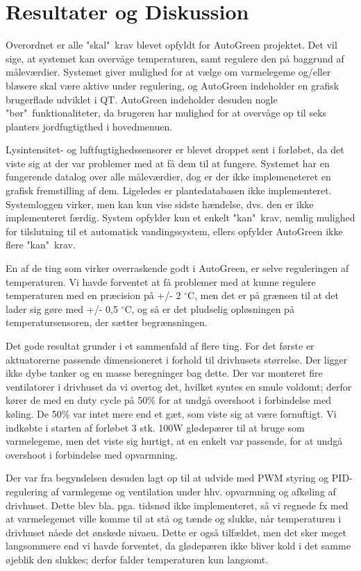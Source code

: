\section{Resultater og Diskussion} \label{ch:Resultater_og_diskussion}

Overordnet er alle "skal"\ krav blevet opfyldt for AutoGreen projektet. 
Det vil sige, at systemet kan overvåge temperaturen, samt regulere den på baggrund af måleværdier. 
Systemet giver mulighed for at vælge om varmelegeme og/eller blæsere skal være aktive under regulering, og AutoGreen indeholder en grafisk brugerflade udviklet i QT. 
AutoGreen indeholder desuden nogle "bør"\ funktionaliteter, da brugeren har mulighed for at overvåge op til seks planters jordfugtigthed i hovedmenuen. 

Lysintensitet- og luftfugtighedssensorer er blevet droppet sent i forløbet, da det viste sig at der var problemer med at få dem til at fungere. 
Systemet har en fungerende datalog over alle måleværdier, dog er der ikke implemeneteret en grafisk fremstilling af dem. 
Ligeledes er plantedatabasen ikke implementeret.
Systemloggen virker, men kan kun vise sidste hændelse, dvs. den er ikke implementeret færdig.
System opfylder kun et enkelt "kan"\ krav, nemlig mulighed for tilslutning til et automatisk vandingssystem, ellers opfylder AutoGreen ikke flere "kan"\ krav. 

\mbox{}

En af de ting som virker overraskende godt i AutoGreen, er selve reguleringen af temperaturen. 
Vi havde forventet at få problemer med at kunne regulere temperaturen med en præcision på +/- 2 $^{\circ}$C, men det er på grænsen til at det lader sig gøre med +/- 0,5 $^{\circ}$C, og så er det pludselig opløsningen på temperatursensoren, der sætter begrænsningen. 

Det gode resultat grunder i et sammenfald af flere ting. 
For det første er aktuatorerne passende dimensioneret i forhold til drivhusets størrelse. 
Der ligger ikke dybe tanker og en masse beregninger bag dette. 
Der var monteret fire ventilatorer i drivhuset da vi overtog det, hvilket syntes en smule voldomt; derfor kører de med en duty cycle på 50\% for at undgå overshoot i forbindelse med køling.
De 50\% var intet mere end et gæt, som viste sig at være fornuftigt.
Vi indkøbte i starten af forløbet 3 stk. 100W glødepærer til at bruge som varmelegeme, men det viste sig hurtigt, at en enkelt var passende, for at undgå overshoot i forbindelse med opvarmning.  

Der var fra begyndelsen desuden lagt op til at udvide med PWM styring og PID-regulering af varmlegeme og ventilation under hhv. opvarmning og afkøling af drivhuset. 
Dette blev bla. pga. tidsnød ikke implementeret, så vi regnede fx med at varmelegemet ville komme til at stå og tænde og slukke, når temperaturen i drivhuset nåede det ønskede nivaeu. 
Dette er også tilfældet, men det sker meget langsommere end vi havde forventet, da glødepæren ikke bliver kold i det samme øjeblik den slukkes; derfor falder temperaturen kun langsomt. 

